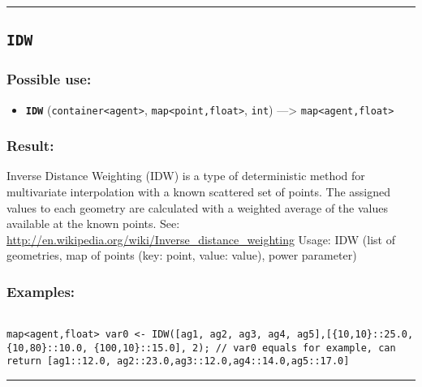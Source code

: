 \documentclass[]{book}
\providecommand{\tightlist}{%
  \setlength{\itemsep}{0pt}\setlength{\parskip}{0pt}}
\theoremstyle{definition}
\theoremstyle{definition}
\theoremstyle{definition}
\theoremstyle{remark}
\begin{document}
\begin{center}\rule{0.5\linewidth}{\linethickness}\end{center}

\subsection{\texorpdfstring{\texttt{IDW}}{IDW}}\label{idw}

\subsubsection{Possible use:}\label{possible-use-263}

\begin{itemize}
\tightlist
\item
  \textbf{\texttt{IDW}}
  (\texttt{container\textless{}agent\textgreater{}},
  \texttt{map\textless{}point,float\textgreater{}}, \texttt{int})
  ---\textgreater{} \texttt{map\textless{}agent,float\textgreater{}}
\end{itemize}

\subsubsection{Result:}\label{result-253}

Inverse Distance Weighting (IDW) is a type of deterministic method for
multivariate interpolation with a known scattered set of points. The
assigned values to each geometry are calculated with a weighted average
of the values available at the known points. See:
\url{http://en.wikipedia.org/wiki/Inverse_distance_weighting} Usage: IDW
(list of geometries, map of points (key: point, value: value), power
parameter)

\subsubsection{Examples:}\label{examples-202}

\begin{verbatim}
 
map<agent,float> var0 <- IDW([ag1, ag2, ag3, ag4, ag5],[{10,10}::25.0, {10,80}::10.0, {100,10}::15.0], 2); // var0 equals for example, can return [ag1::12.0, ag2::23.0,ag3::12.0,ag4::14.0,ag5::17.0]
\end{verbatim}

\begin{center}\rule{0.5\linewidth}{\linethickness}\end{center}
\end{document}
